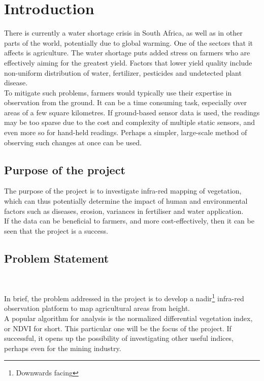 \chapter{Introduction}


There is currently a water shortage crisis in South Africa, as well as in other parts of the world, potentially due to global warming. One of the sectors that it affects is agriculture. The water shortage puts added stress on farmers who are effectively aiming for the greatest yield. Factors that lower yield quality include non-uniform distribution of water, fertilizer, pesticides and undetected plant disease.\\

To mitigate such problems, farmers would typically use their expertise in observation from the ground. It can be a time consuming task, especially over areas of a few square kilometres. If ground-based sensor data is used, the readings may be too sparse due to the cost and complexity of multiple static sensors, and even more so for hand-held readings. Perhaps a simpler, large-scale method of observing such changes at once can be used.

\section{Purpose of the project}

The purpose of the project is to investigate infra-red mapping of vegetation, which can thus potentially determine the impact of human and environmental factors such as diseases, erosion, variances in fertiliser and water application.\\

If the data can be beneficial to farmers, and more cost-effectively, then it can be seen that the project is a success.

\section{Problem Statement}\

In brief, the problem addressed in the project is to develop a nadir\footnote{Downwards facing} infra-red observation platform to map agricultural areas from height.\\

A popular algorithm for analysis is the normalized differential vegetation index, or NDVI for short. This particular one will be the focus of the project. If successful, it opens up the possibility of investigating other useful indices, perhaps even for the mining industry.\\

